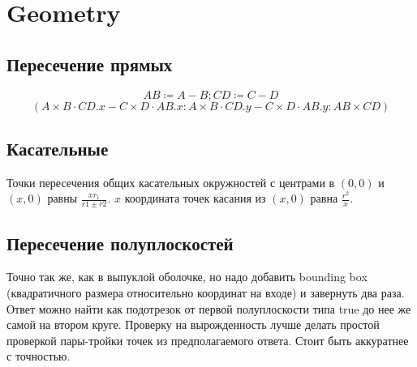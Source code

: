 \section{Geometry}

\subsection{Пересечение прямых}

\begin{equation*}
	AB \coloneqq A - B; CD \coloneqq C - D
\end{equation*}
\begin{equation*}
	(A \times B \cdot CD.x - C \times D \cdot AB.x : A \times B \cdot CD.y - C \times D \cdot AB.y : AB \times CD)
\end{equation*}

\subsection{Касательные}

Точки пересечения общих касательных окружностей с центрами в $(0, 0)$ и $(x, 0)$ равны $\frac{x r_1}{r1 \pm r2}$.
$x$ координата точек касания из $(x, 0)$ равна $\frac{r^2}{x}$.

\subsection{Пересечение полуплоскостей}

Точно так же, как в выпуклой оболочке, но надо добавить bounding box (квадратичного размера относительно координат на входе) и завернуть два раза.
Ответ можно найти как подотрезок от первой полуплоскости типа true до нее же самой на втором круге.
Проверку на вырожденность лучше делать простой проверкой пары-тройки точек из предполагаемого ответа. Стоит быть аккуратнее с точностью.
